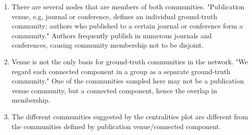 \documentclass[11pt]{article}
\begin{document}
\begin{enumerate}
\def\labelenumi{\arabic{enumi}.}
\item
  There are several nodes that are members of both communities.
  "Publication venue, e.g, journal or conference, defines an individual
  ground-truth community; authors who published to a certain journal or
  conference form a community." Authors frequently publish in numerous
  journals and conferences, causing community membership not to be
  disjoint.
\item
  Venue is not the only basis for ground-truth communities in the
  network. "We regard each connected component in a group as a separate
  ground-truth community." One of the communities sampled here may not
  be a publication venue community, but a connected component, hence the
  overlap in membership.
\item
  The different communities suggested by the centralities plot are
  different from the communities defined by publication venue/connected
  component.
\end{enumerate}
\end{document}
